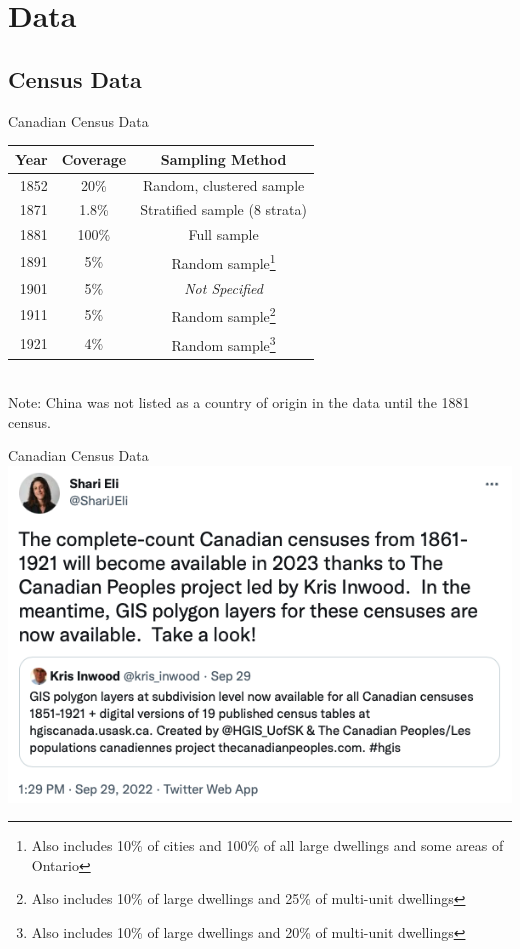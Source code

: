 \documentclass[pdf]{beamer}
\begin{document}
\section{Data}
\subsection{Census Data}
\begin{frame}{Canadian Census Data}
    \centering
    \begin{tabular}{|r||c|c|}
        \hline 
        Year & Coverage & Sampling Method \\
        \hline 
        1852 & 20\% & Random, clustered sample \\
        1871 & 1.8\% & Stratified sample (8 strata)\\
        1881 & 100\% & Full sample \\
        1891 & 5\% & Random sample\footnote{Also includes 10\% of cities and 100\% of all large dwellings and some areas of Ontario} \\
        1901 & 5\% & \textit{Not Specified} \\
        1911 & 5\% & Random sample\footnote{Also includes 10\% of large dwellings and 25\% of multi-unit dwellings} \\
        1921 & 4\% & Random sample\footnote{Also includes 10\% of large dwellings and 20\% of multi-unit dwellings} \\
        \hline
    \end{tabular} \\
    Note: China was not listed as a country of origin in the data until the 1881 census.
\end{frame}

\begin{frame}{Canadian Census Data}
    \includegraphics[width = \textwidth]{../../figs/census_tweet.png}
\end{frame}
\end{document}
